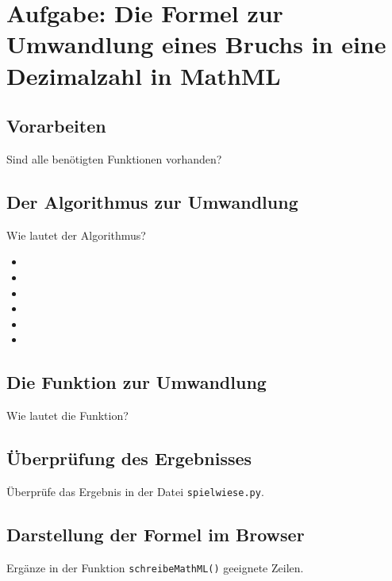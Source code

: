 \section{Aufgabe: Die Formel zur Umwandlung eines Bruchs in eine Dezimalzahl in MathML}

\subsection*{Vorarbeiten}

Sind alle benötigten Funktionen vorhanden?

\subsection*{Der Algorithmus zur Umwandlung}

Wie lautet der Algorithmus?

{\Large
	\begin{itemize}
		\item  
		\item  
		\item  
		\item  
		\item  
		\item  
	\end{itemize}
}

\subsection*{Die Funktion zur Umwandlung}

Wie lautet die Funktion?

\subsection*{Überprüfung des Ergebnisses}

Überprüfe das Ergebnis in der Datei \texttt{spielwiese.py}.

\subsection*{Darstellung der Formel im Browser}

Ergänze in der Funktion \texttt{schreibeMathML()} geeignete Zeilen.